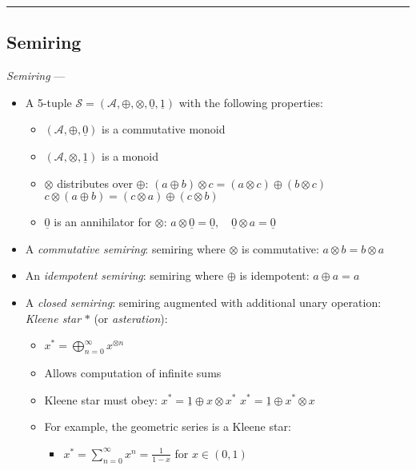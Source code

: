 {\color{black}\hrule height 0.001mm}

\subsection*{Semiring}
\emph{Semiring} ---
\begin{itemize}
    \item A 5-tuple $\mathcal{S} = (\mathcal{A}, \oplus, \otimes, \underline{0}, \underline{1})$ with the following properties:
    \begin{itemize}
        \item $(\mathcal{A}, \oplus, \underline{0})$ is a commutative monoid
        \item $(\mathcal{A}, \otimes, \underline{1})$ is a monoid
        \item $\otimes$ distributes over $\oplus$:
        $
        (a \oplus b) \otimes c = (a \otimes c) \oplus (b \otimes c)
        $
        $
        c \otimes (a \oplus b) = (c \otimes a) \oplus (c \otimes b)
        $
        \item $\underline{0}$ is an annihilator for $\otimes$:
        $
        a \otimes \underline{0} = \underline{0}, \quad \underline{0} \otimes a = \underline{0}
        $
    \end{itemize}
    \item A \emph{commutative semiring}: semiring where $\otimes$ is commutative: $a \otimes b = b \otimes a$
    \item An \emph{idempotent semiring}: semiring where $\oplus$ is idempotent: $a \oplus a = a$
    \item A \emph{closed semiring}: semiring augmented with additional unary operation: \emph{Kleene star} $*$ (or \emph{asteration}):
    \begin{itemize}
        \item $
        x^* = \bigoplus_{n=0}^\infty x^{\otimes n}
        $
        \item Allows computation of infinite sums
        \item Kleene star must obey:
        $
        x^* = \underline{1} \oplus x \otimes x^*$
        $x^* = \underline{1} \oplus x^* \otimes x
        $
        \item For example, the geometric series is a Kleene star:
        \begin{itemize}
            \item $
            x^* = \sum_{n=0}^\infty x^n = \frac{1}{1 - x}$ for $x \in (0, 1)$\\

\end{itemize}
\end{itemize}
\end{itemize}
